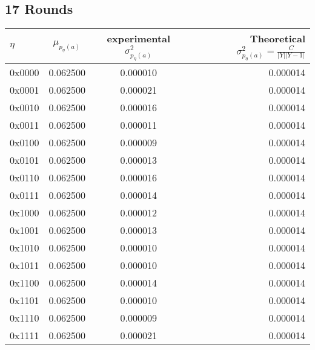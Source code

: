 \documentclass[9pt]{article}
\begin{document}
\subsection{17 Rounds}
\begin{tabular}{l*{2}{c}r}
$\eta$ & $\mu_{p_{\eta}(a)}$ & experimental $\sigma^2_{p_{\eta}(a)}$ & Theoretical $\sigma^2_{p_{\eta}(a)} = \frac{C}{|Y||Y-1|}$ \\
\hline
0x0000 & 0.062500 & 0.000010 & 0.000014 \\
0x0001 & 0.062500 & 0.000021 & 0.000014 \\
0x0010 & 0.062500 & 0.000016 & 0.000014 \\
0x0011 & 0.062500 & 0.000011 & 0.000014 \\
0x0100 & 0.062500 & 0.000009 & 0.000014 \\
0x0101 & 0.062500 & 0.000013 & 0.000014 \\
0x0110 & 0.062500 & 0.000016 & 0.000014 \\
0x0111 & 0.062500 & 0.000014 & 0.000014 \\
0x1000 & 0.062500 & 0.000012 & 0.000014 \\
0x1001 & 0.062500 & 0.000013 & 0.000014 \\
0x1010 & 0.062500 & 0.000010 & 0.000014 \\
0x1011 & 0.062500 & 0.000010 & 0.000014 \\
0x1100 & 0.062500 & 0.000014 & 0.000014 \\
0x1101 & 0.062500 & 0.000010 & 0.000014 \\
0x1110 & 0.062500 & 0.000009 & 0.000014 \\
0x1111 & 0.062500 & 0.000021 & 0.000014 \\
\end{tabular}
\end{document}
